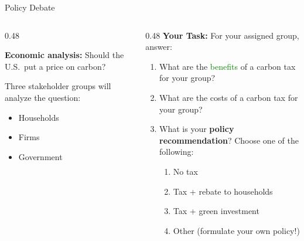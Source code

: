 \documentclass[9pt,english,aspectratio=169]{beamer}
\begin{document}
\begin{frame}{Policy Debate}

  \begin{columns}[c]
    \begin{column}{0.48\textwidth}
      \begin{questionbox}
        \textbf{Economic analysis:} Should the U.S.\ put a price on carbon?
      \end{questionbox}

      \vspace{0.5em}
      Three stakeholder groups will analyze the question:
      \begin{itemize}
        \item Households
        \item Firms
        \item Government
      \end{itemize}

    \end{column}
    \begin{column}{0.48\textwidth}
      \textbf{Your Task:} For your assigned group, answer:
      \vspace{0.3em}

      \begin{enumerate}
        \item What are the \textcolor{green}{benefits} of a carbon tax for your group?
        \vspace{0.3em}
        \item What are the \textcolor{vermillion}{costs} of a carbon tax for your group?
        \vspace{0.3em}
        \item What is your \textbf{policy recommendation}? Choose one of the following:
        \begin{enumerate}
          \item No tax
          \item Tax + rebate to households 
          \item Tax + green investment 
          \item Other (formulate your own policy!) 
        \end{enumerate}
      \end{enumerate}

    \end{column}
  \end{columns}

\end{frame}
\end{document}
